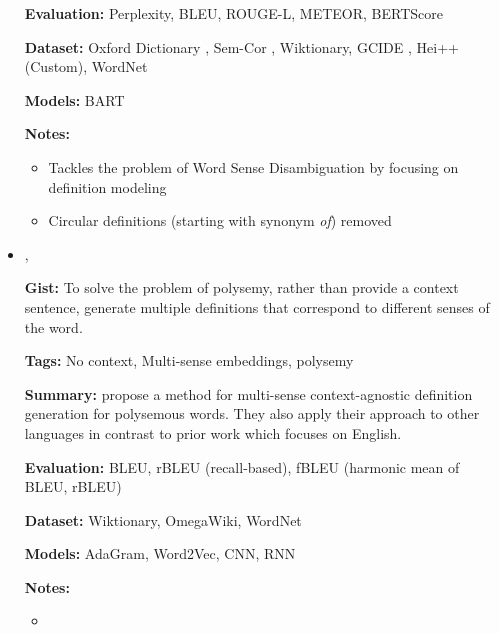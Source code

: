\documentclass{article}[a4paper]
\newcommand{\bitem}[2]{
    \item[\cite{#1}]
        \textbf{\citetitle{#1}}

        \citeauthor{#1}, \citeyear{#1}
        \newline\newline
        {#2}
}%
\begin{document}
\begin{itemize}
{        \textbf{Evaluation:}
        Perplexity, BLEU, ROUGE-L, METEOR, BERTScore

        \textbf{Dataset:}
        Oxford Dictionary \cite{chang_what_2019},
        Sem-Cor \cite{miller_semantic_1993},
        Wiktionary,
        GCIDE \cite{noraset_definition_2016},
        Hei++ (Custom),
        WordNet

        \textbf{Models:}
        BART

        \textbf{Notes:}
        \begin{itemize}
            \item Tackles the problem of Word Sense Disambiguation by
                  focusing on definition modeling
            \item Circular definitions (starting with synonym \textit{of})
                  removed
        \end{itemize}
    }%

    \bitem{sojka_evaluating_2020}%
    {%
        \textbf{Gist:}
        To solve the problem of polysemy, rather than provide a context
        sentence, generate multiple definitions that correspond to different
        senses of the word.

        \textbf{Tags:}
        No context, Multi-sense embeddings, polysemy

        \textbf{Summary:}
        \citeauthor{sojka_evaluating_2020} propose a method for multi-sense
        context-agnostic definition generation for polysemous words. They also
        apply their approach to other languages in contrast to prior work which
        focuses on English.

        \textbf{Evaluation:}
        BLEU,
        rBLEU (recall-based),
        fBLEU (harmonic mean of BLEU, rBLEU)

        \textbf{Dataset:}
        Wiktionary,
        OmegaWiki,
        WordNet

        \textbf{Models:}
        AdaGram, Word2Vec, CNN, RNN

        \textbf{Notes:}
        \begin{itemize}
            \item
        \end{itemize}
    }%
\end{itemize}
\end{document}
